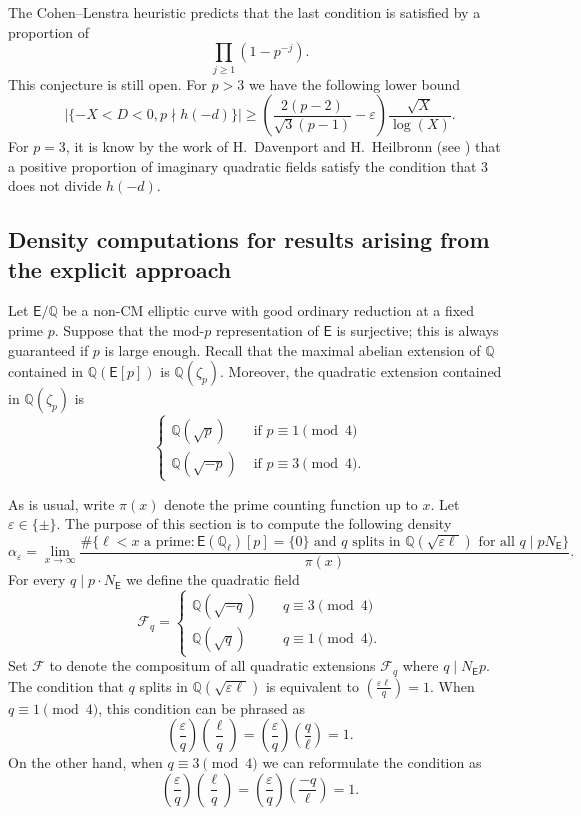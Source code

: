 \documentclass{amsart}
\numberwithin{equation}{section}
\theoremstyle{remark}
\newcommand{\Q}{\mathbb{Q}}
\newcommand{\EC}{\mathsf{E}}
\theoremstyle{plain} %
\begin{document}
The Cohen--Lenstra heuristic predicts that the last condition is satisfied by a proportion of 
\[
\prod_{j\geq 1}(1-p^{-j}).
\]
This conjecture is still open.
For $p>3$ we have the following lower bound \cite{kohen-ono}
\[
\vert\{-X<D<0, p\nmid h(-d)\}\vert \ge \left(\frac{2(p-2)}{\sqrt{3}(p-1)}-\varepsilon\right)\frac{\sqrt{X}}{\log(X)}.
\]
For $p=3$, it is know by the work of H.~Davenport and H.~Heilbronn (see \cite{davenport-heilbronn}) that a positive proportion of imaginary quadratic fields satisfy the condition that $3$ does not divide $h(-d)$.


\subsection{Density computations for results arising from the explicit approach}
Let $\EC/\Q$ be a non-CM elliptic curve with good ordinary reduction at a fixed prime $p$.
Suppose that the mod-$p$ representation of $\EC$ is surjective; this is always guaranteed if $p$ is large enough.
Recall that the maximal abelian extension of $\Q$ contained in $\Q(\EC[p])$ is $\Q(\zeta_p)$.
Moreover, the quadratic extension contained in $\Q(\zeta_p)$ is
\[
\begin{cases}
    \Q(\sqrt{p}) & \text{ if } p \equiv 1\pmod{4}\\
    \Q(\sqrt{-p}) & \text{ if } p \equiv 3\pmod{4}.
\end{cases}
\]

As is usual, write $\pi(x)$ denote the prime counting function up to $x$.
Let $\varepsilon \in \{\pm\}$.
The purpose of this section is to compute the following density
\[
\alpha_{\varepsilon} = \lim_{x\rightarrow\infty} \frac{\# \{\ell < x \text{ a prime} \colon \EC(\Q_{\ell})[p] = \{0\} \text{ and } q \text{ splits in } \Q(\sqrt{\varepsilon \ell})\text{ for all }q\mid pN_{\EC} \}}{\pi(x)}.
\]
For every $q\mid p\cdot N_{\EC}$ we define the quadratic field
\[
\mathcal{F}_q=\begin{cases}
    \Q(\sqrt{-q})\quad &q\equiv 3\pmod{4}\\
    \Q(\sqrt{q})\quad &q\equiv 1\pmod{4}.
\end{cases}
\]
Set $\mathcal{F}$ to denote the compositum of all quadratic extensions $\mathcal{F}_q$ where $q\mid N_{\EC}p$.
The condition that $q$ splits in $\Q(\sqrt{\varepsilon \ell})$ is equivalent to $\left(\frac{\varepsilon \ell}{q}\right)=1$. 
When $q\equiv 1\pmod 4$, this condition can be phrased as
\[
\left(\frac{\varepsilon}{q}\right)\left(\frac{\ell}{q}\right) = \left(\frac{\varepsilon}{q}\right)\left(\frac{q}{\ell}\right)=1.
\]
On the other hand, when $q\equiv 3\pmod 4$ we can reformulate the condition as
\[
\left(\frac{\varepsilon}{q}\right)\left(\frac{\ell}{q}\right)  = \left(\frac{\varepsilon}{q}\right)\left(\frac{-q}{\ell}\right)=1.
\]
\end{document}
